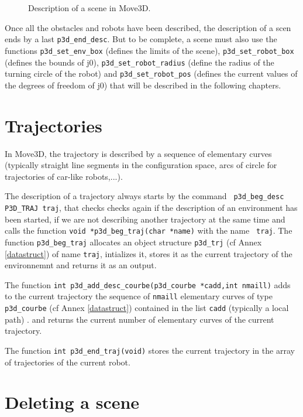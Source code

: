 \begin{figure}[hbt]
\centerline{
}
\caption{\small 
Description of a scene in Move3D.
}
\label{FIG_ROBOT}
\end{figure}

Once all the obstacles and robots have been described, the description
of a scen ends by a last {\tt p3d\_end\_desc}. But to be complete, a
scene must also use the functions {\tt p3d\_set\_env\_box} (defines the
limits of the scene), {\tt p3d\_set\_robot\_box} (defines the bounds
of j0), {\tt p3d\_set\_robot\_radius} (define the radius of the
turning circle of the robot) and {\tt p3d\_set\_robot\_pos} (defines
the current values of the degrees of freedom of j0) that will be
described in the following chapters.

\section{Trajectories}

In Move3D, the trajectory is described by a sequence of elementary
curves (typically straight line segments in the configuration space,
arcs of circle for trajectories of car-like robots,...).

The description of a trajectory always starts by the command {\tt
p3d\_beg\_desc P3D\_TRAJ traj}, that checks checks again if the
description of an environment has been started, if we are not
describing another trajectory at the same time and calls the
function {\tt void *p3d\_beg\_traj(char *name)} 
with the name {\tt
traj}. The function {\tt p3d\_beg\_traj} allocates an object structure
{\tt p3d\_trj} (cf Annex \ref{datastruct}) of name {\tt traj},
intializes it, stores it as the current trajectory of the environnemnt
and returns it as an output.

The function {\tt int p3d\_add\_desc\_courbe(p3d\_courbe *cadd,int
nmaill)}  adds to the current trajectory the sequence of {\tt nmaill}
elementary curves of type {\tt p3d\_courbe} (cf Annex
\ref{datastruct}) contained in the list {\tt cadd} (typically a local
path) . and returns the current number of elementary curves of the
current trajectory.

The function {\tt int p3d\_end\_traj(void)}  stores the current
trajectory in the array of trajectories of the current robot.


\section{Deleting a scene}

